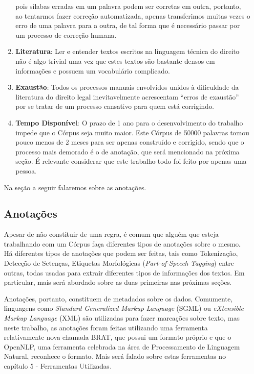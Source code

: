 \documentclass[11pt]{report}
\newcommand{\quotes}[1]{``#1''}
\begin{document}
\begin{enumerate}[label=\textbf{\arabic*.}]
  pois sílabas erradas em um palavra podem ser corretas em outra, portanto, ao tentarmos fazer correção automatizada, apenas transferimos muitas vezes o erro de uma palavra
  para a outra, de tal forma que é necessário passar por um processo de correção humana.
  \item \textbf{Literatura}: Ler e entender textos escritos na linguagem técnica do direito não é algo trivial uma vez que estes textos são bastante densos em informações e
  possuem um vocabulário complicado.
  \item \textbf{Exaustão}: Todos os processos manuais envolvidos unidos à dificuldade da literatura do direito legal inevitavelmente acrescentam \quotes{erros de exaustão}
  por se tratar de um processo cansativo para quem está corrigindo.
  \item \textbf{Tempo Disponível}: O prazo de 1 ano para o desenvolvimento do trabalho impede que o Córpus seja muito maior. Este Córpus de 50000 palavras tomou pouco menos de 2 meses
  para ser apenas construído e corrigido, sendo que o processo mais demorado é o de anotação, que será mencionado na próxima seção. É relevante considerar que este trabalho
  todo foi feito por apenas uma pessoa.
\end{enumerate}

Na seção a seguir falaremos sobre as anotações.

\subsection{Anotações}

\indent\indent Apesar de não constituir de uma regra, é comum que alguém que esteja trabalhando com um Córpus faça diferentes tipos de anotações sobre o mesmo.
Há diferentes tipos de anotações que podem ser feitas, tais como Tokenização, Detecção de Setenças, Etiquetas Morfológicas (\textit{Part-of-Speech Tagging}) entre outras, todas
usadas para extrair diferentes tipos de informações dos textos. Em particular, mais será abordado sobre as duas primeiras nas próximas seções.

Anotações, portanto, constituem de metadados sobre os dados. Comumente, linguagens como \textit{Standard Generalized Markup Language} (SGML) ou
\textit{eXtensible Markup Language} (XML) são utilizadas para fazer marcações sobre texto, mas
neste trabalho, as anotações foram feitas utilizando uma ferramenta relativamente nova chamada BRAT, que possui um
formato próprio e que o OpenNLP, uma ferramenta celebrada na área de Processamento de Linguagem Natural, reconhece o formato.
Mais será falado sobre estas ferramentas no capítulo 5 - Ferramentas Utilizadas.
\end{document}
